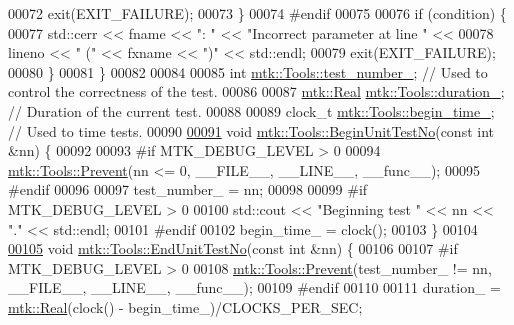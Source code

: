 \begin{DoxyCode}
00072     exit(EXIT\_FAILURE);
00073   \}
00074 \textcolor{preprocessor}{  #endif}
00075 
00076   \textcolor{keywordflow}{if} (condition) \{
00077     std::cerr << fname << \textcolor{stringliteral}{": "} << \textcolor{stringliteral}{"Incorrect parameter at line "} <<
00078     lineno << \textcolor{stringliteral}{" ("} << fxname << \textcolor{stringliteral}{")"} << std::endl;
00079     exit(EXIT\_FAILURE);
00080   \}
00081 \}
00082 
00084 
00085 \textcolor{keywordtype}{int} \hyperlink{classmtk_1_1Tools_a04a60458594336ee1badff79b8a9a77f}{mtk::Tools::test\_number\_};  \textcolor{comment}{// Used to control the correctness of the test.}
00086 
00087 \hyperlink{group__c01-roots_gac080bbbf5cbb5502c9f00405f894857d}{mtk::Real} \hyperlink{classmtk_1_1Tools_aba9d3d2952a3de9e7b46faa86d28d692}{mtk::Tools::duration\_};  \textcolor{comment}{// Duration of the current test.}
00088 
00089 clock\_t \hyperlink{classmtk_1_1Tools_a4bd58d08397db42271ed9e2d3ecc9963}{mtk::Tools::begin\_time\_};  \textcolor{comment}{// Used to time tests.}
00090 
\hypertarget{mtk__tools_8cc_source_l00091}{}\hyperlink{classmtk_1_1Tools_a26ee906d28523378522a75e25c3a4e19}{00091} \textcolor{keywordtype}{void} \hyperlink{classmtk_1_1Tools_a26ee906d28523378522a75e25c3a4e19}{mtk::Tools::BeginUnitTestNo}(\textcolor{keyword}{const} \textcolor{keywordtype}{int} &nn) \{
00092 
00093 \textcolor{preprocessor}{  #if MTK\_DEBUG\_LEVEL > 0}
00094   \hyperlink{classmtk_1_1Tools_afe5bb096309258e2e72503fd7b41c7e0}{mtk::Tools::Prevent}(nn <= 0, \_\_FILE\_\_, \_\_LINE\_\_, \_\_func\_\_);
00095 \textcolor{preprocessor}{  #endif}
00096 
00097   test\_number\_ = nn;
00098 
00099 \textcolor{preprocessor}{  #if MTK\_DEBUG\_LEVEL > 0}
00100   std::cout << \textcolor{stringliteral}{"Beginning test "} << nn << \textcolor{stringliteral}{"."} << std::endl;
00101 \textcolor{preprocessor}{  #endif}
00102   begin\_time\_ = clock();
00103 \}
00104 
\hypertarget{mtk__tools_8cc_source_l00105}{}\hyperlink{classmtk_1_1Tools_ad8cf0085133dd40c913fe195bc5b9694}{00105} \textcolor{keywordtype}{void} \hyperlink{classmtk_1_1Tools_ad8cf0085133dd40c913fe195bc5b9694}{mtk::Tools::EndUnitTestNo}(\textcolor{keyword}{const} \textcolor{keywordtype}{int} &nn) \{
00106 
00107 \textcolor{preprocessor}{  #if MTK\_DEBUG\_LEVEL > 0}
00108   \hyperlink{classmtk_1_1Tools_afe5bb096309258e2e72503fd7b41c7e0}{mtk::Tools::Prevent}(test\_number\_ != nn, \_\_FILE\_\_, \_\_LINE\_\_, \_\_func\_\_);
00109 \textcolor{preprocessor}{  #endif}
00110 
00111   duration\_ = \hyperlink{group__c01-roots_gac080bbbf5cbb5502c9f00405f894857d}{mtk::Real}(clock() - begin\_time\_)/CLOCKS\_PER\_SEC;

\end{DoxyCode}

